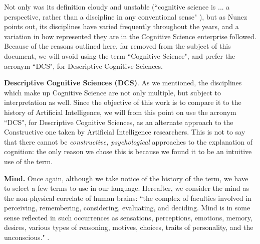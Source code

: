 \documentclass[../main.tex]{subfiles}
\begin{document}
Not only was its definition cloudy and unstable (``cognitive science is ... a perspective, rather than a discipline in any conventional sense"  \parencite{sheehyCognitiveScience1995}), but as Nunez points out, its disciplines have varied frequently throughout the years, and a variation in how represented they are in the Cognitive Science enterprise followed. Because of the reasons outlined here, far removed from the subject of this document, we will avoid using the term ``Cognitive Science", and prefer the acronym ``DCS", for Descriptive Cognitive Sciences.

\vspace{5pt}
\textbf{Descriptive Cognitive Sciences (DCS)}. As we mentioned, the disciplines which make up Cognitive Science are not only multiple, but subject to interpretation as well. Since the objective of this work is to compare it to the history of Artificial Intelligence, we will from this point on use the acronym ``DCS", for Descriptive Cognitive Sciences, as an alternate approach to the Constructive one taken by Artificial Intelligence researchers. This is not to say that there cannot be \textit{constructive, psychological} approaches to the explanation of cognition: the only reason we chose this is because we found it to be an intuitive use of the term.

\vspace{5pt}
\textbf{Mind.} Once again, although we take notice of the history of the term, we have to select a few terms to use in our language. Hereafter, we consider the mind as the non-physical correlate of human brains: ``the complex of faculties involved in perceiving, remembering, considering, evaluating, and deciding. Mind is in some sense reflected in such occurrences as sensations, perceptions, emotions, memory, desires, various types of reasoning, motives, choices, traits of personality, and the unconscious." \parencite{Mind}.
\end{document}
